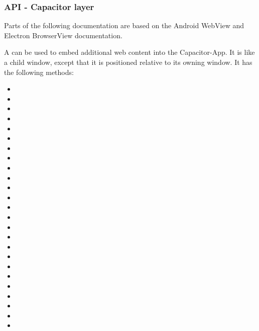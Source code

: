\subsubsection{API - Capacitor layer}
\label{sec:Capacitor-BrowserView:API_CapacitorLayer}

\begin{note}[Note]
  Parts of the following documentation are based on the Android WebView and Electron BrowserView documentation.
  \cite{android:api, electron:docs}
\end{note}

A  can be used to embed additional web content into the Capacitor-App.
It is like a child window, except that it is positioned relative to its owning window.
It has the following methods:

\begin{multicols}{2}
  \begin{itemize}
    \setlength\itemsep{-0.8em}
    \item {}
    \item {}
    \item {}
    \item {}
    \item {}
    \item {}
    \item {}
    \item {}
    \item {}
    \item {}
    \item {}
    \item {}
    \item {}
    \item {}
    \item {}
    \item {}
    \item {}
    \item {}
    \item {}
    \item {}
    \item {}
    \item {}
    \item {}
    \item {}
    \item {}
    \end{itemize}
\end{multicols}

